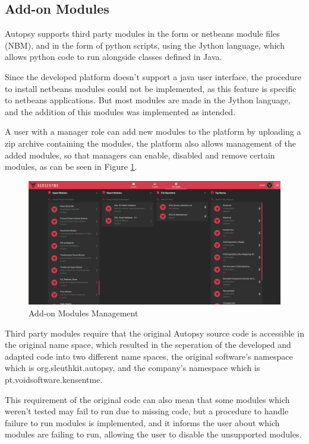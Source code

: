 \subsection{Add-on Modules}

Autopsy supports third party modules in the form or netbeans module files (NBM), and in the form of python scripts, using the Jython language, which allows python code to run alongside classes defined in Java.

Since the developed platform doesn't support a java user interface, the procedure to install netbeans modules could not be implemented, as this feature is specific to netbeans applications. 
But most modules are made in the Jython language, and the addition of this modules was implemented as intended.

A user with a manager role can add new modules to the platform by uploading a zip archive containing the modules, the platform also allows management of the added modules, so that managers can enable, disabled and remove certain modules, as can be seen in Figure \ref{fig:settings}.

\begin{figure}[ht]
 \centering
 \includegraphics[width=1\linewidth]{imgs/settings.png}
 \caption{Add-on Modules Management}
 \label{fig:settings}
\end{figure}

Third party modules require that the original Autopsy source code is accessible in the original name space, which resulted in the seperation of the
developed and adapted code into two different name spaces, the original software's namespace which is org.sleuthkit.autopsy, and the company's namespace which is pt.voidsoftware.kensentme. 

This requirement of the original code can also mean that some modules which weren't tested may fail to run due to missing code, but a procedure to handle failure to run modules is implemented, 
and it informs the user about which modules are failing to run, allowing the user to disable the unsupported modules.

